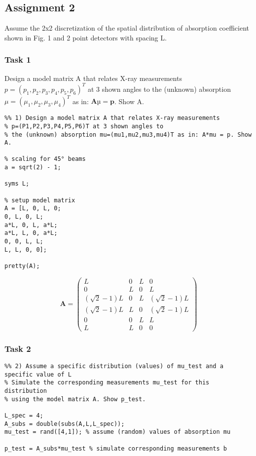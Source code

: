 \subsection*{Assignment 2}
Assume the 2x2 discretization of the spatial distribution of absorption coefficient shown in Fig. 1 and 2 point detectors with spacing L.

\subsubsection*{Task 1}
Design a model matrix A that relates X-ray measurements $p= (p_1, p_2, p_3, p_4, p_5, p_6)^T$ at 3 shown angles to the (unknown) absorption $\mu= (\mu_1, \mu_2, \mu_3, \mu_4)^T$ as in: $ \mathbf{A} \mathbf{µ} = \mathbf{p} $. Show A.

\begin{lstlisting}
%% 1) Design a model matrix A that relates X-ray measurements 
% p=(P1,P2,P3,P4,P5,P6)T at 3 shown angles to 
% the (unknown) absorption mu=(mu1,mu2,mu3,mu4)T as in: A*mu = p. Show A.

% scaling for 45° beams
a = sqrt(2) - 1; 

syms L;

% setup model matrix
A = [L, 0, L, 0;
0, L, 0, L;
a*L, 0, L, a*L;
a*L, L, 0, a*L;
0, 0, L, L;
L, L, 0, 0];

pretty(A);
\end{lstlisting}

\begin{equation}
    \mathbf{A} = \left(\begin{array}{cccc} L & 0 & L & 0\\ 0 & L & 0 & L\\ (\sqrt{2} - 1)L & 0 & L &  (\sqrt{2} - 1)L \\  (\sqrt{2} - 1)L  & L & 0 &  (\sqrt{2} - 1)L \\ 0 & 0 & L & L\\ L & L & 0 & 0 \end{array}\right)
\end{equation}


\subsubsection*{Task 2}
\begin{lstlisting}
%% 2) Assume a specific distribution (values) of mu_test and a specific value of L
% Simulate the corresponding measurements mu_test for this distribution
% using the model matrix A. Show p_test.

L_spec = 4;
A_subs = double(subs(A,L,L_spec));
mu_test = rand([4,1]); % assume (random) values of absorption mu

p_test = A_subs*mu_test % simulate corresponding measurements b
\end{lstlisting}


